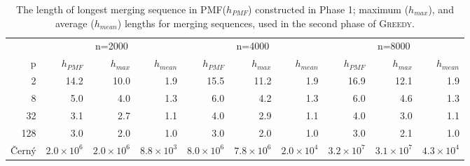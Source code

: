 \documentclass[12pt]{article}
\newcommand{\comment}[2]{{\color{red}{\bf (#1: #2)}}}
\newcommand{\greedyAlgo}{\textsc{Greedy}}
\begin{document}
\begin{table}[ht]
	\center
	\begin{tabular}{r|rrr|rrr|rrr}
 		& \multicolumn{3}{c|}{n=2000} & \multicolumn{3}{c|}{n=4000} & \multicolumn{3}{c}{n=8000} \\
		p &  $h_{PMF}$ &  $h_{max}$ &  $h_{mean}$ &  $h_{PMF}$ &  $h_{max}$ &  $h_{mean}$ &  $h_{PMF}$ &  $h_{max}$ &  $h_{mean}$ \\ \hline
 		2 &  14.2 &  10.0 &  1.9 &  15.5 &  11.2 &  1.9 &  16.9 &  12.1 &  1.9 \\
 		8 &  5.0 &  4.0 &  1.3 &  6.0 &  4.2 &  1.3 &  6.0 &  4.6 &  1.3 \\
		32 &  3.1 &  2.7 &  1.1 &  4.0 &  2.9 &  1.1 &  4.0 &  3.0 &  1.1 \\
		128 &  3.0 &  2.0 &  1.0 &  3.0 &  2.0 &  1.0 &  3.0 &  2.1 &  1.0 \\
		\v{C}ern\'y & $2.0\times10^6$ & $2.0\times10^6$ & $8.8\times10^3$ & $8.0\times10^6$ & $7.8\times10^6$ & $2.0\times10^4$ & $3.2\times10^7$ & $3.1\times10^7$ & $4.3\times10^4$
	\end{tabular}
	\caption{The length of longest merging sequence in PMF($h_{PMF}$) constructed in Phase 1; maximum ($h_{max}$), and average ($h_{mean}$) lengths for merging sequences, used in the second phase of \greedyAlgo. \comment{sertac}{cerny deney sonuclari cok uzun oldu. yeni tabloya mi koysam? yoksa kuculteyim mi?}}
	\label{table:levels}
\end{table}
\end{document}
